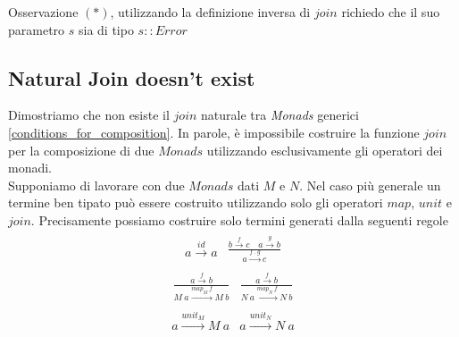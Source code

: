 Osservazione $(*)$, utilizzando la definizione inversa di $join$ richiedo che il suo
parametro $s$ sia di tipo $s::Error$


\pagebreak
\subsection{Natural Join doesn't exist}
\label{natural_join_doesn_t_exist}
Dimostriamo che non esiste il $join$ naturale tra \textit{Monads} generici
\ref{conditions_for_composition}.
In parole, è impossibile costruire la funzione $join$ per la composizione di due
$Monads$ utilizzando esclusivamente gli operatori dei monadi.\\
Supponiamo di lavorare con due $Monads$ dati $M$ e $N$.
Nel caso più generale un termine ben tipato può essere costruito utilizzando
solo gli operatori $map$, $unit$ e $join$.
Precisamente possiamo costruire solo termini generati dalla seguenti regole
\begin{align*}
  \begin{split}
    a \overset{id}{\longrightarrow} a
  \end{split}
    \begin{split}
      \frac
        {b \overset{f}{\longrightarrow} c\quad a \overset{g}{\longrightarrow} b}
        {a \overset{f\ .\ g}{\longrightarrow} c}
    \end{split}
\end{align*}
\begin{align*}
  \begin{split}
    \frac
      {a \overset{f}{\longrightarrow} b}
      {M\ a \overset{map_M\ f}{\longrightarrow} M\ b}
  \end{split}
  \begin{split}
    \frac
      {a \overset{f}{\longrightarrow} b}
      {N\ a \overset{map_N\ f}{\longrightarrow} N\ b}
  \end{split}
\end{align*}
\begin{align*}
  \begin{split}
    a \overset{unit_M}{\longrightarrow} M\ a
  \end{split}
  \begin{split}
    a \overset{unit_N}{\longrightarrow} N\ a
  \end{split}
\end{align*}
